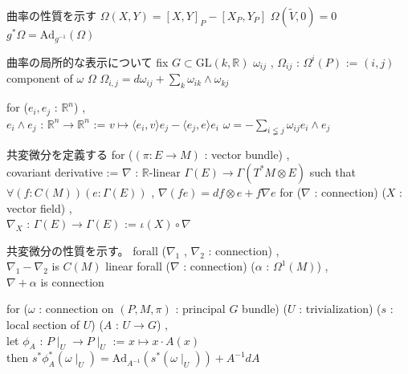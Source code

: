 \begin{Theorem}
\itemnote
  曲率の性質を示す
\itemdefi
  \(\Omega(X , Y) = [X , Y]_P - [X_P , Y_P]\)
\itemdefi
  \(\Omega(\tilde{V} , 0) = 0\)
\itemdefi
  \(g^* \Omega = \text{Ad}_{g^{-1}}(\Omega)\)
\end{Theorem}

\begin{Theorem}
\itemnote
  曲率の局所的な表示について
\itemwhen fix \(G \subset \text{GL}(k , \mathbb{R})\)
\itemdefi
  \(\omega_{ij}\) , \(\Omega_{ij}\) : \(\Omega^i(P)\) := \((i,j)\) component of \(\omega\) \(\Omega\)
\itemprop
  \(\Omega_{i,j} = d \omega_{ij} + \sum_k \omega_{ik} \wedge \omega_{kj}\)
\end{Theorem}

\begin{Theorem}
\itemdefi
  for (\(e_i , e_j\) : \(\mathbb{R}^n\)) ,\\
  \(e_i \wedge e_j\) : \(\mathbb{R}^n \to \mathbb{R}^n\) := \(v \mapsto \langle e_i , v \rangle e_j - \langle e_j , e \rangle e_i\)
\itemdefi
  \(\omega = - \sum_{i \lneqq j} \omega_{ij} e_i \wedge e_j\)
\end{Theorem}

\begin{Definition}
\itemnote
  共変微分を定義する
\itemdefi
  for (\((\pi : E \to M)\) : vector bundle) ,\\
  covariant derivative := \(\nabla\) : \(\mathbb{R}\text{-linear } \Gamma(E) \to \Gamma(T^*M \otimes E)\) such that \(\forall (f : C(M)) (e : \Gamma(E))\) , \(\nabla(f e) = d f \otimes e + f \nabla e\)
\itemdefi
  for (\(\nabla\) : connection) (\(X\) : vector field) ,\\
  \(\nabla_X\) : \(\Gamma(E) \to \Gamma(E)\) := \(\iota (X) \circ \nabla\)
\end{Definition}

\begin{Theorem}
\itemnote
  共変微分の性質を示す。
\itemprop
  forall (\(\nabla_1\) , \(\nabla_2\) : connection) ,\\
  \(\nabla_1 - \nabla_2\) is \(C(M)\) linear
\itemprop
  forall (\(\nabla\) : connection) (\(\alpha\) : \(\Omega^1(M)\)) ,\\
  \(\nabla + \alpha\) is connection
\end{Theorem}

\begin{Theorem}
\itemnote
  for (\(\omega\) : connection on \((P , M , \pi)\) : principal \(G\) bundle) (\(U\) : trivialization) (\(s\) : local section of \(U\)) (\(A\) : \(U \to G\)) ,\\
  let \(\phi_A\) : \(P \mid_{U} \to P \mid_{U}\) := \(x \mapsto x \cdot A(x)\) \\
  then \(s^* \phi_A^* (\omega \mid_{U}) = \text{Ad}_{A^{-1}} (s^* (\omega \mid_{U})) + A^{-1}dA\)
\end{Theorem}

